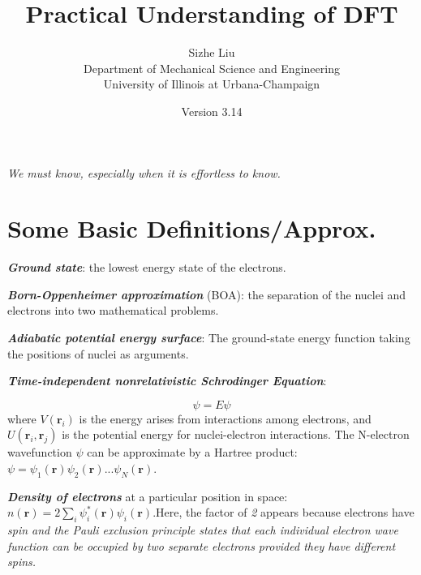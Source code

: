 \documentclass[12pt]{article}
\begin{document}
\title{Practical Understanding of DFT}
\author{Sizhe Liu\\Department of Mechanical Science and Engineering \\University of Illinois at Urbana-Champaign\\ } 
\date{Version 3.14}
\begin{titlingpage}
\maketitle
\end{titlingpage}

\newpage
\tableofcontents
\newpage
\vspace*{100pt}
\textit{We must know, especially when it is effortless to know.}
\newpage

\section{Some Basic Definitions/Approx.}
\textbf{\textit{Ground state}}: the lowest energy state of the electrons.

\textbf{\textit{Born-Oppenheimer approximation}} (BOA): the separation of the nuclei and electrons into two mathematical problems.

\textbf{\textit{Adiabatic potential energy surface}}: The ground-state energy function taking the positions of nuclei as arguments.

\textbf{\textit{Time-independent nonrelativistic Schrodinger Equation}}:

\begin{equation}
    [-\frac{\hbar^2}{2m}\sum^N_{i=1}\nabla^2_i+\sum^N_{i=1}V(\boldsymbol{r}_i)+\sum_{i=1}^N\sum_{j<i}U(\boldsymbol{r}_i, \boldsymbol{r}_j)]\psi = E\psi
\end{equation}
where $V(\boldsymbol{r}_i)$ is the energy arises from interactions among electrons, and $U(\boldsymbol{r}_i, \boldsymbol{r}_j)$ is the potential energy for nuclei-electron interactions. The N-electron wavefunction $\psi$ can be approximate by a Hartree product:$\psi=\psi_1(\boldsymbol{r})\psi_2(\boldsymbol{r})...\psi_N(\boldsymbol{r})$.

\textbf{\textit{Density of electrons}} at a particular position in space:  $n(\boldsymbol{r})=2\sum_i\psi^*_i(\boldsymbol{r})\psi_i(\boldsymbol{r})$.Here, the factor of \textit{2} appears because electrons have \textit{spin and the Pauli exclusion principle states that each individual electron wave function can be occupied by two separate electrons provided they have different spins.}
\end{document}

